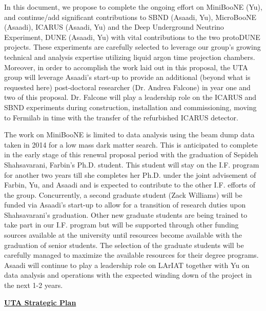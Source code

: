 In this document, we propose to complete the ongoing effort on MiniBooNE (Yu), and continue/add significant contributions to SBND (Asaadi, Yu), MicroBooNE (Asaadi), ICARUS (Asaadi, Yu) and the Deep Underground Neutrino Experiment, DUNE (Asaadi, Yu) with vital contributions to the two protoDUNE projects. These experiments are carefully selected to leverage our group's growing technical and analysis expertise utilizing liquid argon time projection chambers. Moreover, in order to accomplish the work laid out in this proposal, the UTA group will leverage Asaadi's start-up to provide an additional (beyond what is requested here) post-doctoral researcher (Dr. Andrea Falcone) in year one and two of this proposal. Dr. Falcone will play a leadership role on the ICARUS and SBND experiments during construction, installation and commissioning, moving to Fermilab in time with the transfer of the refurbished ICARUS detector.

The work on MiniBooNE is limited to data analysis using the beam dump data taken in 2014 for a low mass dark matter search. This is anticipated to complete in the early stage of this renewal proposal period with the graduation of Sepideh Shahsavarani, Farbin’s Ph.D. student. This student will stay on the I.F. program for another two years till she completes her Ph.D. under the joint advisement of Farbin, Yu, and Asaadi and is expected to contribute to the other I.F. efforts of the group. Concurrently, a second graduate student (Zack Williams) will be funded via Asaadi's start-up to allow for a transition of research duties upon Shahsavarani's graduation.  Other new graduate students are being trained to take part in our I.F. program but will be supported through other funding sources available at the university until resources become available with the graduation of senior students.  The selection of the graduate students will be carefully managed to maximize the available resources for their degree programs. Asaadi will continue to play a leadership role on LArIAT together with Yu on data analysis and operations with the expected winding down of the project in the next 1-2 years.

\begin{center}
\textbf{\underline{UTA Strategic Plan} }
\end{center}


